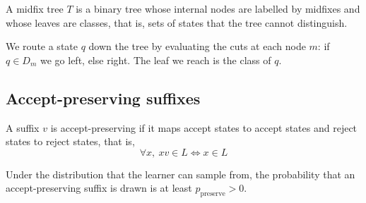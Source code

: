 \begin{definition}\label{def:tree}
A midfix tree $T$ is a binary tree whose internal nodes are labelled by midfixes
and whose leaves are classes, that is, sets of states that the tree cannot distinguish.

We route a state $q$ down the tree by evaluating the cuts at each node $m$: if $q\in D_m$ we go left, else right. The leaf we reach is the class of $q$.
\end{definition}

\subsection{Accept-preserving suffixes}

\begin{definition}\label{def:accept-preserving}
A suffix $v$ is accept-preserving if it maps accept states to accept states and reject states to reject states, that is,
$$\forall x,\ xv\in L\iff x\in L$$
\end{definition}

\begin{assumption}\label{ass:preserve}
Under the distribution that the learner can sample from, the probability that an accept-preserving suffix is drawn is at least $p_{\mathrm{preserve}}>0$.
\end{assumption}
